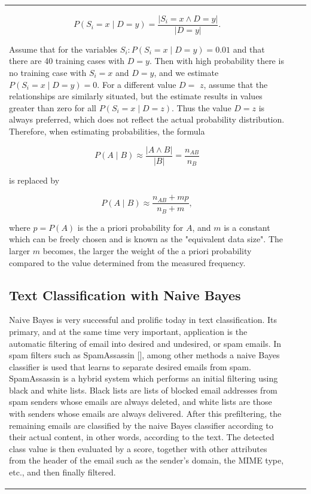 \documentclass[10pt]{book}
\begin{document}
\begin{center}
\begin{tabular}{|l|l|l|}
$$
P\left(S_{i}=x \mid D=y\right)=\frac{\left|S_{i}=x \wedge D=y\right|}{|D=y|} .
$$

Assume that for the variables $S_{i}: P\left(S_{i}=x \mid D=y\right)=0.01$ and that there are 40 training cases with $D=y$. Then with high probability there is no training case with $S_{i}=x$ and $D=y$, and we estimate $P\left(S_{i}=x \mid D=y\right)=0$. For a different value $D=$ $z$, assume that the relationships are similarly situated, but the estimate results in values greater than zero for all $P\left(S_{i}=x \mid D=z\right)$. Thus the value $D=z$ is always preferred, which does not reflect the actual probability distribution. Therefore, when estimating probabilities, the formula

$$
P(A \mid B) \approx \frac{|A \wedge B|}{|B|}=\frac{n_{A B}}{n_{B}}
$$

is replaced by

$$
P(A \mid B) \approx \frac{n_{A B}+m p}{n_{B}+m},
$$

where $p=P(A)$ is the a priori probability for $A$, and $m$ is a constant which can be freely chosen and is known as the "equivalent data size". The larger $m$ becomes, the larger the weight of the a priori probability compared to the value determined from the measured frequency.

\subsection{Text Classification with Naive Bayes}
Naive Bayes is very successful and prolific today in text classification. Its primary, and at the same time very important, application is the automatic filtering of email into desired and undesired, or spam emails. In spam filters such as SpamAssassin [\cite{sch04}], among other methods a naive Bayes classifier is used that learns to separate desired emails from spam. SpamAssassin is a hybrid system which performs an initial filtering using black and white lists. Black lists are lists of blocked email addresses from spam senders whose emails are always deleted, and white lists are those with senders whose emails are always delivered. After this prefiltering, the remaining emails are classified by the naive Bayes classifier according to their actual content, in other words, according to the text. The detected class value is then evaluated by a score, together with other attributes from the header of the email such as the sender's domain, the MIME type, etc., and then finally filtered.


\end{tabular}
\end{center}
\end{document}
